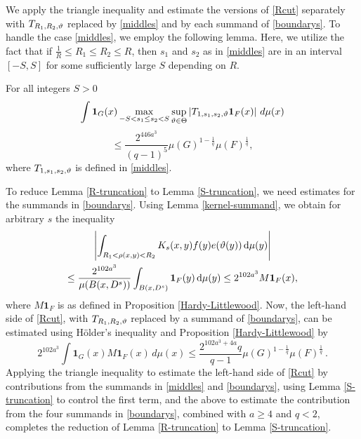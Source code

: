 We apply the triangle inequality and estimate the versions of \eqref{Rcut} separately with $T_{R_1,R_2,{\vartheta}}$ replaced by \eqref{middles} and by each summand of \eqref{boundarys}. To handle the case \eqref{middles}, we employ the following lemma. Here, we utilize the fact that if $\frac 1R\le R_1\le R_2\le R$, then $s_1$ and $s_2$ as in \eqref{middles} are in an interval $[-S,S]$ for some sufficiently large $S$ depending on $R$.


\begin{lemma}[S truncation]
\label{S-truncation}
For all integers $S>0$
$$
    \int \mathbf{1}_{G}(x)
    \max_{-S<s_1\le s_2<S}\sup_{{\vartheta}\in{\Theta}}
    \left| T_{1, s_1,s_2,{\vartheta}} \mathbf{1}_{F}(x) \right|\, d\mu(x)
$$
\begin{equation} \label{Scut}
    \leq \frac{2^{446a^3}}{(q-1)^5} \mu(G)^{1 - \frac{1}{q}} \mu(F)^{\frac{1}{q}},
\end{equation}
where $T_{1, s_1,s_2,{\vartheta}}$ is defined in \eqref{middles}.
\end{lemma}

To reduce Lemma \ref{R-truncation} to Lemma \ref{S-truncation}, we need estimates for the summands in \eqref{boundarys}. Using Lemma \ref{kernel-summand}, we obtain for arbitrary $s$ the inequality
\begin{multline}
\left|\int_{R_1 <  \rho(x,y) < R_2}  K_s(x,y) f(y) e({\vartheta}(y)) \,  \mathrm{d}\mu(y)\right|\\
\leq \frac{2^{102 a^3}}{\mu(B(x, D^{s}))}
 \int_{B(x, D^s)} \mathbf{1}_F(y)  \, \mathrm{d}\mu(y)
\leq 2^{102 a^3} M\mathbf{1}_F(x),
\end{multline}
where $M\mathbf{1}_F$ is as defined in Proposition \ref{Hardy-Littlewood}.
Now, the left-hand side of \eqref{Rcut}, with $T_{R_1,R_2,{\vartheta}}$ replaced by a summand of \eqref{boundarys}, can be estimated using Hölder's inequality and Proposition \ref{Hardy-Littlewood} by
$$
    2^{102 a^3}\int \mathbf{1}_{G}(x) M\mathbf{1}_F(x)\, d\mu(x)
    \leq \frac{2^{102 a^3+4a}q}{q-1}\mu(G)^{1-\frac{1}{q}} \mu(F)^{\frac{1}{q}}\,.
$$
Applying the triangle inequality to estimate the left-hand side of \eqref{Rcut} by contributions from the summands in \eqref{middles} and \eqref{boundarys}, using Lemma \ref{S-truncation} to control the first term, and the above to estimate the contribution from the four summands in \eqref{boundarys}, combined with $a\geq 4$ and $q < 2$, completes the reduction of Lemma \ref{R-truncation} to Lemma \ref{S-truncation}.

